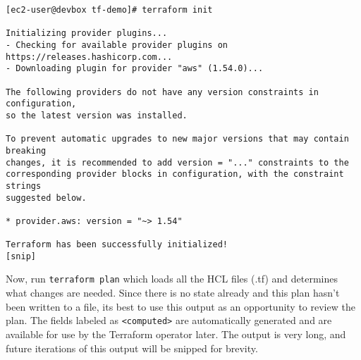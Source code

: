 \begin{verbatim}
[ec2-user@devbox tf-demo]# terraform init

Initializing provider plugins...
- Checking for available provider plugins on https://releases.hashicorp.com...
- Downloading plugin for provider "aws" (1.54.0)...

The following providers do not have any version constraints in configuration,
so the latest version was installed.

To prevent automatic upgrades to new major versions that may contain breaking
changes, it is recommended to add version = "..." constraints to the
corresponding provider blocks in configuration, with the constraint strings
suggested below.

* provider.aws: version = "~> 1.54"

Terraform has been successfully initialized!
[snip]
\end{verbatim}

Now, run \verb|terraform plan| which loads all the HCL files (.tf) and determines
what changes are needed. Since there is no state already and this plan hasn't
been written to a file, its best to use this output as an opportunity to
review the plan. The fields labeled as \verb|<computed>| are automatically generated
and are available for use by the Terraform operator later. The output is very
long, and future iterations of this output will be snipped for brevity.

